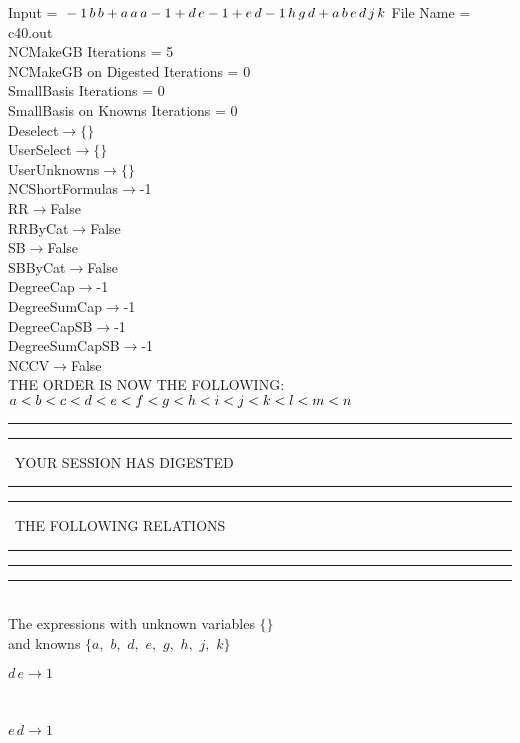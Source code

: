 \documentclass[rep10,leqno]{report}
\begin{document}
\normalsize
\baselineskip=12pt
\noindent
Input = 
$
\\-1\,
 b\,
 b + a\,
 a\,
 a\\
-1 + d\,
 e\\
-1 + e\,
 d\\
-1\,
 h\,
 g\,
 d + a\,
 b\,
 e\,
 d\,
 j\,
 k\\
$
File Name = c40.out\\
NCMakeGB Iterations = 5\\
NCMakeGB on Digested Iterations = 0\\
SmallBasis Iterations = 0\\
SmallBasis on Knowns Iterations = 0\\
Deselect$\rightarrow \{\}$\\
UserSelect$\rightarrow \{\}$\\
UserUnknowns$\rightarrow \{\}$\\
NCShortFormulas$\rightarrow$-1\\
RR$\rightarrow $False\\
RRByCat$\rightarrow $False\\
SB$\rightarrow $False\\
SBByCat$\rightarrow $False\\
DegreeCap$\rightarrow $-1\\
DegreeSumCap$\rightarrow $-1\\
DegreeCapSB$\rightarrow $-1\\
DegreeSumCapSB$\rightarrow $-1\\
NCCV$\rightarrow $False\\
THE ORDER IS NOW THE FOLLOWING:\hfil\break
$
a<b<c<d<e<f<g<h<i<j<k<l<m<n\\
$
\rule[2pt]{6in}{4pt}\hfil\break
\rule[2pt]{1.879in}{4pt}
\ YOUR SESSION HAS DIGESTED\ 
\rule[2pt]{1.879in}{4pt}\hfil\break
\rule[2pt]{1.923in}{4pt}
\ THE FOLLOWING RELATIONS\ 
\rule[2pt]{1.923in}{4pt}\hfil\break
\rule[2pt]{6in}{4pt}\hfil\break
\rule[3pt]{6in}{.7pt}\\
The expressions with unknown variables $\{\}$\\
and knowns $\{a,
$ $
b,
$ $
d,
$ $
e,
$ $
g,
$ $
h,
$ $
j,
$ $
k\}$\smallskip\\
\begin{minipage}{6in}
$
d\,
 e\rightarrow 1
$
\end{minipage}\medskip \\
\begin{minipage}{6in}
$
e\,
 d\rightarrow 1
$
\end{minipage}\medskip \\
\end{document}
